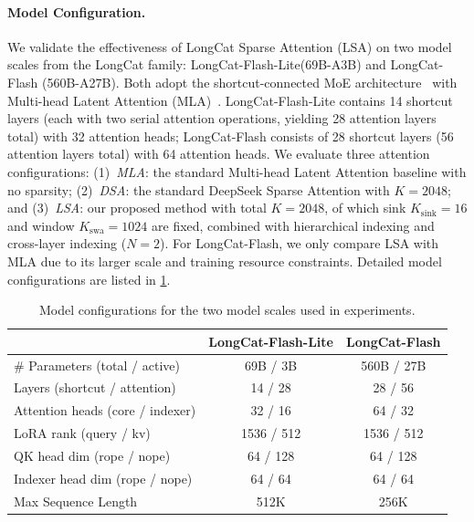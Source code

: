 \documentclass{article}
\newcommand{\longcat}{LongCat-Flash-Lite\xspace}
\newcommand{\kmax}{K}
\begin{document}
\paragraph{Model Configuration.}
We validate the effectiveness of LongCat Sparse Attention (LSA) on two model scales from the LongCat family: \longcat (69B-A3B) and LongCat-Flash (560B-A27B). Both adopt the shortcut-connected MoE architecture~\citep{cai2024shortcut} with Multi-head Latent Attention (MLA)~\citep{liu2024deepseekv2}. \longcat contains 14 shortcut layers (each with two serial attention operations, yielding 28 attention layers total) with 32 attention heads; LongCat-Flash consists of 28 shortcut layers (56 attention layers total) with 64 attention heads. We evaluate three attention configurations: (1)~\emph{MLA}: the standard Multi-head Latent Attention baseline with no sparsity; (2)~\emph{DSA}: the standard DeepSeek Sparse Attention with $\kmax = 2048$; and (3)~\emph{LSA}: our proposed method with total $\kmax = 2048$, of which sink $K_{\text{sink}} = 16$ and window $K_{\text{swa}} = 1024$ are fixed, combined with hierarchical indexing and cross-layer indexing ($N = 2$).  For LongCat-Flash, we only compare LSA with MLA due to its larger scale and training resource constraints. Detailed model configurations are listed in \cref{tab:model_config}.

\begin{table}[htbp]
\centering
\caption{Model configurations for the two model scales used in experiments.}
\label{tab:model_config}
\small
\begin{tabular}{lcc}
\toprule
 & \textbf{\longcat} & \textbf{LongCat-Flash} \\
\midrule
\# Parameters (total / active) & 69B / 3B & 560B / 27B \\
\midrule
Layers (shortcut / attention) & 14 / 28 & 28 / 56 \\
Attention heads (core / indexer) & 32 / 16 & 64 / 32 \\
LoRA rank (query / kv) & 1536 / 512 & 1536 / 512 \\
QK head dim (rope / nope) & 64 / 128 & 64 / 128 \\
Indexer head dim (rope / nope) & 64 / 64 & 64 / 64 \\
\midrule
Max Sequence Length      & 512K & 256K \\
\bottomrule
\end{tabular}
\end{table}
\end{document}
